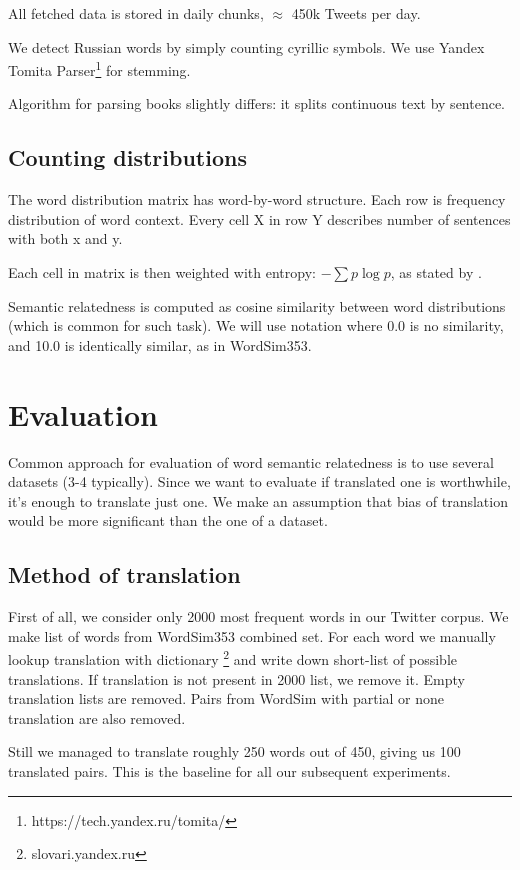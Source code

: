 \documentclass[11pt,letterpaper]{article}
\begin{document}
All fetched data is stored in daily chunks, $\approx$ 450k Tweets per day.

We detect Russian words by simply counting cyrillic symbols. We use Yandex Tomita 
Parser\footnote{https://tech.yandex.ru/tomita/} for stemming.

Algorithm for parsing books slightly differs:
it splits continuous text by sentence.

\subsection{Counting distributions}

The word distribution matrix has word-by-word structure. 
Each row is frequency distribution of word context. 
Every cell X in row Y describes number of sentences with both x and y.

Each cell in matrix is then weighted with entropy: 
$- \sum p \log p$, as stated by \cite{landauer1998introduction}.

Semantic relatedness is computed as cosine similarity between word distributions 
(which is common for such task).
We will use notation where 0.0 is no similarity, and 10.0 is identically similar, 
as in WordSim353.

\section{Evaluation}

Common approach for evaluation of word semantic relatedness is to use several datasets (3-4 typically). 
Since we want to evaluate if translated one is worthwhile, it's enough to translate just one. 
We make an assumption that bias of translation would be more significant than the one of a dataset.

\subsection{Method of translation}

First of all, we consider only 2000 most frequent words in our Twitter corpus.  
We make list of words from WordSim353 combined set. For each word we manually 
lookup translation with dictionary \footnote{slovari.yandex.ru} and write down short-list 
of possible translations. If translation is not present in 2000 list, we remove it. 
Empty translation lists are removed. Pairs from WordSim with partial or none 
translation are also removed.

Still we managed to translate roughly 250 words out of 450, giving us 100 translated pairs.
This is the baseline for all our subsequent experiments. 
\end{document}
